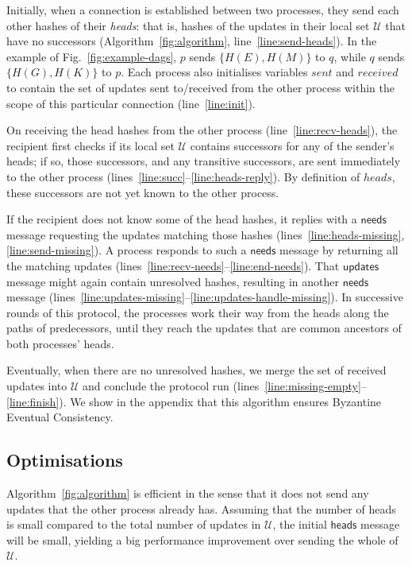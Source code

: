 \documentclass[a4paper,anonymous,USenglish]{lipics-v2019}
\begin{document}
Initially, when a connection is established between two processes, they send each other hashes of their \emph{heads}: that is, hashes of the updates in their local set $\mathcal{U}$ that have no successors (Algorithm~\ref{fig:algorithm}, line~\ref{line:send-heads}).
In the example of Fig.~\ref{fig:example-dags}, $p$ sends $\{H(E),H(M)\}$ to $q$, while $q$ sends $\{H(G),H(K)\}$ to $p$.
Each process also initialises variables $\mathit{sent}$ and $\mathit{received}$ to contain the set of updates sent to/received from the other process within the scope of this particular connection (line~\ref{line:init}).

On receiving the head hashes from the other process (line~\ref{line:recv-heads}), the recipient first checks if its local set $\mathcal{U}$ contains successors for any of the sender's heads; if so, those successors, and any transitive successors, are sent immediately to the other process (lines~\ref{line:succ}--\ref{line:heads-reply}).
By definition of $\mathit{heads}$, these successors are not yet known to the other process.

If the recipient does not know some of the head hashes, it replies with a $\mathsf{needs}$ message requesting the updates matching those hashes (lines~\ref{line:heads-missing}, \ref{line:send-missing}).
A process responds to such a $\mathsf{needs}$ message by returning all the matching updates (lines~\ref{line:recv-needs}--\ref{line:end-needs}).
That $\mathsf{updates}$ message might again contain unresolved hashes, resulting in another $\mathsf{needs}$ message (lines~\ref{line:updates-missing}--\ref{line:updates-handle-missing}).
In successive rounds of this protocol, the processes work their way from the heads along the paths of predecessors, until they reach the updates that are common ancestors of both processes' heads.

Eventually, when there are no unresolved hashes, we merge the set of received updates into $\mathcal{U}$ and conclude the protocol run (lines~\ref{line:missing-empty}--\ref{line:finish}).
We show in the appendix that this algorithm ensures Byzantine Eventual Consistency.

\subsection{Optimisations}\label{sec:optimisations}

Algorithm~\ref{fig:algorithm} is efficient in the sense that it does not send any updates that the other process already has.
Assuming that the number of heads is small compared to the total number of updates in $\mathcal{U}$, the initial $\mathsf{heads}$ message will be small, yielding a big performance improvement over sending the whole of $\mathcal{U}$.
\end{document}
